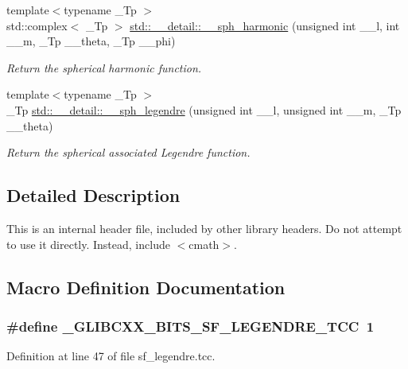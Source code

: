 \begin{DoxyCompactItemize}
{\footnotesize template$<$typename \+\_\+\+Tp $>$ }\\std\+::complex$<$ \+\_\+\+Tp $>$ \hyperlink{namespacestd_1_1____detail_a31b9beb882431d61d439862de0366eec}{std\+::\+\_\+\+\_\+detail\+::\+\_\+\+\_\+sph\+\_\+harmonic} (unsigned int \+\_\+\+\_\+l, int \+\_\+\+\_\+m, \+\_\+\+Tp \+\_\+\+\_\+theta, \+\_\+\+Tp \+\_\+\+\_\+phi)
\begin{DoxyCompactList}\small\item\em Return the spherical harmonic function. \end{DoxyCompactList}\item 
{\footnotesize template$<$typename \+\_\+\+Tp $>$ }\\\+\_\+\+Tp \hyperlink{namespacestd_1_1____detail_a1c819d02915bdc2ab5c7693513ce0be0}{std\+::\+\_\+\+\_\+detail\+::\+\_\+\+\_\+sph\+\_\+legendre} (unsigned int \+\_\+\+\_\+l, unsigned int \+\_\+\+\_\+m, \+\_\+\+Tp \+\_\+\+\_\+theta)
\begin{DoxyCompactList}\small\item\em Return the spherical associated Legendre function. \end{DoxyCompactList}\end{DoxyCompactItemize}


\subsection{Detailed Description}
This is an internal header file, included by other library headers. Do not attempt to use it directly. Instead, include $<$cmath$>$. 

\subsection{Macro Definition Documentation}
\subsubsection[{\texorpdfstring{\+\_\+\+G\+L\+I\+B\+C\+X\+X\+\_\+\+B\+I\+T\+S\+\_\+\+S\+F\+\_\+\+L\+E\+G\+E\+N\+D\+R\+E\+\_\+\+T\+CC}{_GLIBCXX_BITS_SF_LEGENDRE_TCC}}]{\setlength{\rightskip}{0pt plus 5cm}\#define \+\_\+\+G\+L\+I\+B\+C\+X\+X\+\_\+\+B\+I\+T\+S\+\_\+\+S\+F\+\_\+\+L\+E\+G\+E\+N\+D\+R\+E\+\_\+\+T\+CC~1}\hypertarget{sf__legendre_8tcc_adf9a610f8b35f611eab3b1894e967c9f}{}\label{sf__legendre_8tcc_adf9a610f8b35f611eab3b1894e967c9f}


Definition at line 47 of file sf\+\_\+legendre.\+tcc.

